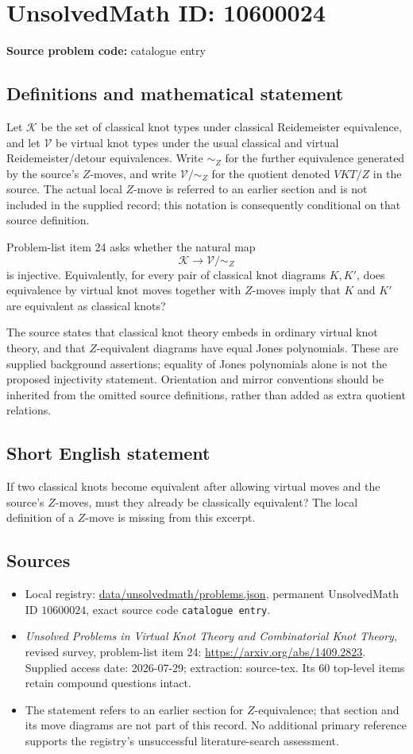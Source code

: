 \documentclass[11pt]{article}
\begin{document}
\section*{UnsolvedMath ID: 10600024}
\textbf{Source problem code:} catalogue entry
\subsection{Definitions and mathematical statement}
Let $\mathcal K$ be the set of classical knot types under classical Reidemeister equivalence, and let $\mathcal V$ be virtual knot types under the usual classical and virtual Reidemeister/detour equivalences. Write $\sim_Z$ for the further equivalence generated by the source's $Z$-moves, and write $\mathcal V/\!\sim_Z$ for the quotient denoted $VKT/Z$ in the source. The actual local $Z$-move is referred to an earlier section and is not included in the supplied record; this notation is consequently conditional on that source definition.

Problem-list item 24 asks whether the natural map
\[
 \mathcal K\longrightarrow\mathcal V/\!\sim_Z
\]
is injective. Equivalently, for every pair of classical knot diagrams $K,K'$, does equivalence by virtual knot moves together with $Z$-moves imply that $K$ and $K'$ are equivalent as classical knots?

The source states that classical knot theory embeds in ordinary virtual knot theory, and that $Z$-equivalent diagrams have equal Jones polynomials. These are supplied background assertions; equality of Jones polynomials alone is not the proposed injectivity statement. Orientation and mirror conventions should be inherited from the omitted source definitions, rather than added as extra quotient relations.
\subsection{Short English statement}
If two classical knots become equivalent after allowing virtual moves and the source's $Z$-moves, must they already be classically equivalent? The local definition of a $Z$-move is missing from this excerpt.
\subsection{Sources}
\begin{itemize}
\item Local registry: \url{data/unsolvedmath/problems.json}, permanent UnsolvedMath ID $10600024$, exact source code \texttt{catalogue entry}.
\item \emph{Unsolved Problems in Virtual Knot Theory and Combinatorial Knot Theory}, revised survey, problem-list item 24: \url{https://arxiv.org/abs/1409.2823}. Supplied access date: 2026-07-29; extraction: source-tex. Its 60 top-level items retain compound questions intact.
\item The statement refers to an earlier section for $Z$-equivalence; that section and its move diagrams are not part of this record. No additional primary reference supports the registry's unsuccessful literature-search assessment.
\end{itemize}
\end{document}
